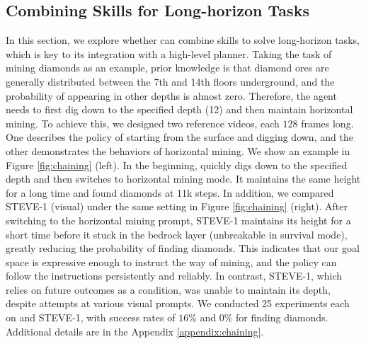 \documentclass[11pt, a4paper, logo, one column]{craftjarvis}
\begin{document}
\subsection{Combining Skills for Long-horizon Tasks}
In this section, we explore whether \agent can combine skills to solve long-horizon tasks, which is key to its integration with a high-level planner. Taking the task of mining diamonds as an example, prior knowledge is that diamond ores are generally distributed between the 7th and 14th floors underground, and the probability of appearing in other depths is almost zero. Therefore, the agent needs to first dig down to the specified depth (12) and then maintain horizontal mining. To achieve this, we designed two reference videos, each $128$ frames long. One describes the policy of starting from the surface and digging down, and the other demonstrates the behaviors of horizontal mining. We show an example in Figure \ref{fig:chaining} (left). In the beginning, \agent quickly digs down to the specified depth and then switches to horizontal mining mode. It maintains the same height for a long time and found diamonds at 11k steps. In addition, we compared STEVE-1 (visual) under the same setting in Figure \ref{fig:chaining} (right). After switching to the horizontal mining prompt, STEVE-1 maintains its height for a short time before it stuck in the bedrock layer (unbreakable in survival mode), greatly reducing the probability of finding diamonds. This indicates that our goal space is expressive enough to instruct the way of mining, and the policy can follow the instructions persistently and reliably. In contrast, STEVE-1, which relies on future outcomes as a condition, was unable to maintain its depth, despite attempts at various visual prompts. We conducted 25 experiments each on \agent and STEVE-1, with success rates of $16\%$ and $0\%$ for finding diamonds. Additional details are in the Appendix \ref{appendix:chaining}. 
\end{document}
